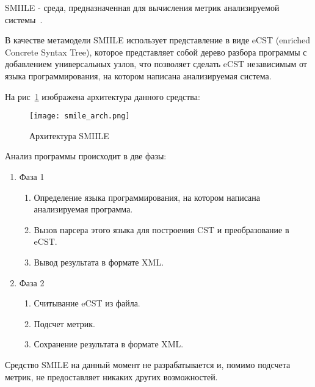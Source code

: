 

SMIILE - среда, предназначенная для вычисления метрик анализируемой
системы~\cite{smile}.

В качестве метамодели SMIILE использует представление в виде eCST (enriched
Concrete Syntax Tree), которое представляет собой дерево разбора программы с
добавлением универсальных узлов, что позволяет сделать eCST независимым от
языка программирования, на котором написана анализируемая система.

На рис~\ref{fig:smile_arch} изображена архитектура данного средства:

\begin{figure}[ht!]
    \begin{center}
        \texttt{[image: smile\_arch.png]}
    \end{center}
    \caption{Архитектура SMIILE}
    \label{fig:smile_arch}
\end{figure}

Анализ программы происходит в две фазы:

\begin{enumerate}
    \item Фаза 1
    \begin{enumerate}
        \item Определение языка программирования, на котором написана
        анализируемая программа.
        \item Вызов парсера этого языка для построения CST и преобразование в
        eCST.
        \item Вывод результата в формате XML.
    \end{enumerate}

    \item Фаза 2
    \begin{enumerate}
        \item Считывание eCST из файла.
        \item Подсчет метрик.
        \item Сохранение результата в формате XML.
    \end{enumerate}
\end{enumerate}

Средство SMILE на данный момент не разрабатывается и, помимо подсчета метрик, не
предоставляет никаких других возможностей.

